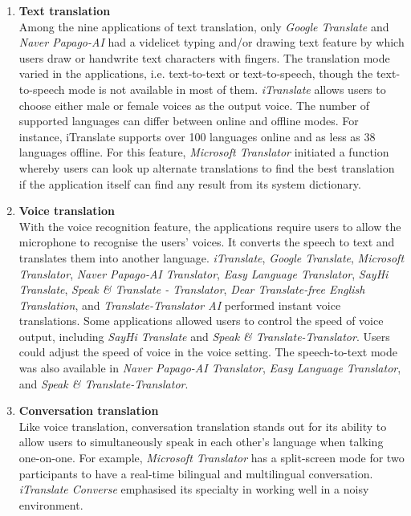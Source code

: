 \documentclass[english]{textolivre}
\begin{document}
\begin{enumerate}
    \item \textbf{Text translation} \\
    Among the nine applications of text translation, only \textit{Google Translate} and \textit{Naver Papago-AI} had a videlicet typing and/or drawing text feature by which users draw or handwrite text characters with fingers. The translation mode varied in the applications, i.e. text-to-text or text-to-speech, though the text-to-speech mode is not available in most of them. \textit{iTranslate} allows users to choose either male or female voices as the output voice. The number of supported languages can differ between online and offline modes. For instance, iTranslate supports over 100 languages online and as less as 38 languages offline. For this feature, \textit{Microsoft Translator} initiated a function whereby users can look up alternate translations to find the best translation if the application itself can find any result from its system dictionary.
    \item \textbf{Voice translation} \\
    With the voice recognition feature, the applications require users to allow the microphone to recognise the users’ voices. It converts the speech to text and translates them into another language. \textit{iTranslate}, \textit{Google Translate}, \textit{Microsoft Translator}, \textit{Naver Papago-AI Translator}, \textit{Easy Language Translator}, \textit{SayHi Translate}, \textit{Speak \& Translate - Translator}, \textit{Dear Translate-free English Translation}, and \textit{Translate-Translator AI} performed instant voice translations. Some applications allowed users to control the speed of voice output, including \textit{SayHi Translate} and \textit{Speak \& Translate-Translator}. Users could adjust the speed of voice in the voice setting. The speech-to-text mode was also available in \textit{Naver Papago-AI Translator}, \textit{Easy Language Translator}, and \textit{Speak \& Translate-Translator}.
    \item \textbf{Conversation translation} \\
    Like voice translation, conversation translation stands out for its ability to allow users to simultaneously speak in each other’s language when talking one-on-one. For example, \textit{Microsoft Translator} has a split-screen mode for two participants to have a real-time bilingual and multilingual conversation. \textit{iTranslate Converse} emphasised its specialty in working well in a noisy environment.

\end{enumerate}
\end{document}
